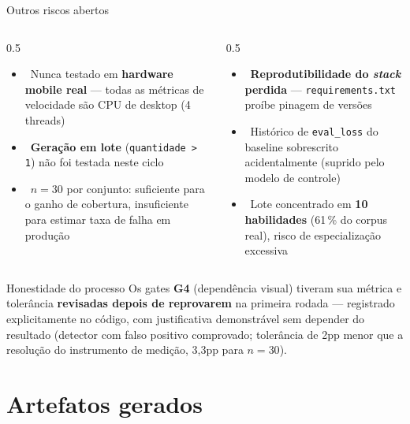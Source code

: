 \documentclass[aspectratio=169,11pt]{beamer}
\newcommand{\warnmark}{{\color{warnorange}\faExclamationTriangle}}
\begin{document}
\begin{frame}{Outros riscos abertos}
  \begin{columns}[T]
    \begin{column}{0.5\textwidth}
      \begin{itemize}
        \item \warnmark\ Nunca testado em \textbf{hardware mobile real} —
          todas as métricas de velocidade são CPU de desktop (4 threads)
        \item \warnmark\ \textbf{Geração em lote} (\texttt{quantidade > 1})
          não foi testada neste ciclo
        \item \warnmark\ $n=30$ por conjunto: suficiente para o ganho de
          cobertura, insuficiente para estimar taxa de falha em produção
      \end{itemize}
    \end{column}
    \begin{column}{0.5\textwidth}
      \begin{itemize}
        \item \warnmark\ \textbf{Reprodutibilidade do \emph{stack} perdida}
          — \texttt{requirements.txt} proíbe pinagem de versões
        \item \warnmark\ Histórico de \texttt{eval\_loss} do baseline
          sobrescrito acidentalmente (suprido pelo modelo de controle)
        \item \warnmark\ Lote concentrado em \textbf{10 habilidades}
          (61\,\% do corpus real), risco de especialização excessiva
      \end{itemize}
    \end{column}
  \end{columns}
  \vspace{0.3cm}
  \begin{block}{Honestidade do processo}
    Os gates \textbf{G4} (dependência visual) tiveram sua métrica e
    tolerância \textbf{revisadas depois de reprovarem} na primeira rodada —
    registrado explicitamente no código, com justificativa demonstrável sem
    depender do resultado (detector com falso positivo comprovado; tolerância
    de 2pp menor que a resolução do instrumento de medição, 3,3pp para $n=30$).
  \end{block}
\end{frame}

\section{Artefatos gerados}
\end{document}
